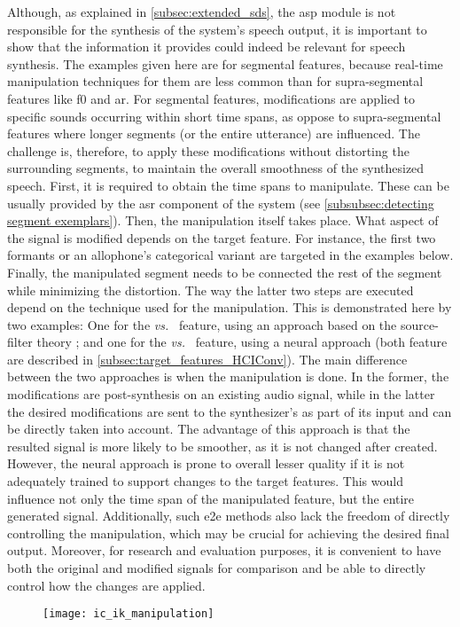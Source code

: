 
Although, as explained in \cref{subsec:extended_sds}, the \ac{asp} module is not responsible for the synthesis of the system's speech output, it is important to show that the information it provides could indeed be relevant for speech synthesis.
The examples given here are for segmental features, because real-time manipulation techniques for  them are less common than for supra-segmental features like \ac{f0} and \ac{ar}.
For segmental features, modifications are applied to specific sounds occurring within short time spans, as oppose to supra-segmental features where longer segments (or the entire utterance) are influenced.
The challenge is, therefore, to apply these modifications without distorting the surrounding segments, to maintain the overall smoothness of the synthesized speech.
First, it is required to obtain the time spans to manipulate.
These can be usually provided by the \ac{asr} component of the system (see \cref{subsubsec:detecting segment exemplars}).
Then, the manipulation itself takes place.
What aspect of the signal is modified depends on the target feature.
For instance, the first two formants or an allophone's categorical variant are targeted in the examples below.
Finally, the manipulated segment needs to be connected the rest of the segment while minimizing the distortion.
The way the latter two steps are executed depend on the technique used for the manipulation.
This is demonstrated here by two examples:
One for the \emph{\textipa{[e]} vs.\ \textipa{[E]}} feature, using an approach based on the source-filter theory \citep{Fant1970acoustic}; and one for the \emph{\textipa{[\c{c}]} vs.\ \textipa{[k]}} feature, using a neural approach (both feature are described in \cref{subsec:target_features_HCIConv}).
The main difference between the two approaches is when the manipulation is done.
In the former, the modifications are post-synthesis on an existing audio signal, while in the latter the desired modifications are sent to the synthesizer's as part of its input and can be directly taken into account.
The advantage of this approach is that the resulted signal is more likely to be smoother, as it is not changed after created.
However, the neural approach is prone to overall lesser quality if it is not adequately trained to support changes to the target features.
This would influence not only the time span of the manipulated feature, but the entire generated signal.
Additionally, such \ac{e2e} methods also lack the freedom of directly controlling the manipulation, which may be crucial for achieving the desired final output.
Moreover, for research and evaluation purposes, it is convenient to have both the original and modified signals for comparison and be able to directly control how the changes are applied.
%
\begin{landscape}
	\begin{figure}[t]
		\centering
		\hspace*{-2cm}
		\texttt{[image: ic\_ik\_manipulation]}
		\caption[]
			{}
		\label{fig:spectrogram_e_E}
	\end{figure}
\end{landscape}
%

